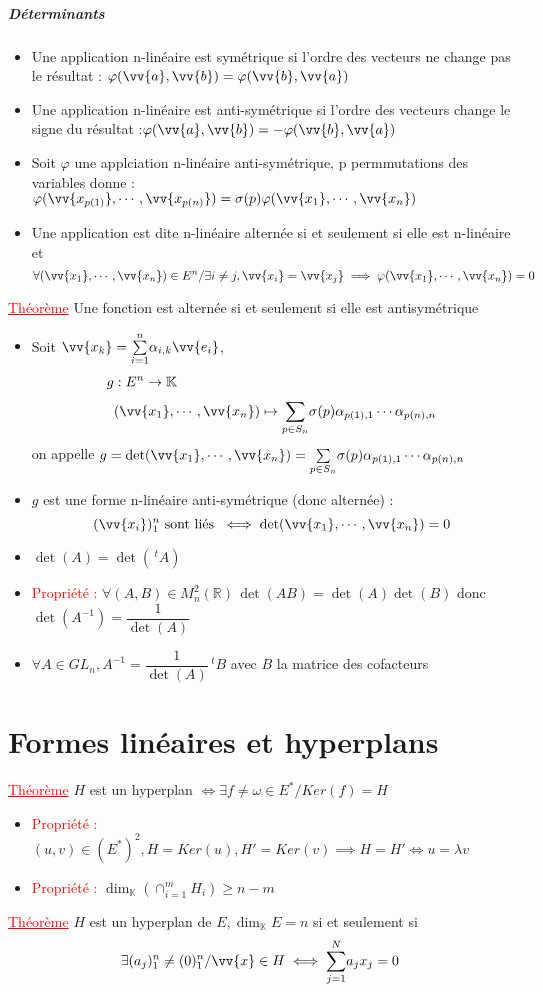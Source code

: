 \documentclass[a4paper, 11pts, french]{article}
\newcommand{\R}{\mathbb{R}}
\newcommand{\K}{\mathbb{K}}
\newcommand{\al}{\alpha}
\newcommand{\la}{\lambda}
\newcommand{\ph}{\varphi}
\newcommand{\som}[2]{\overset{#2}{\underset{#1}{\sum}}}
\newcommand{\thm}{\textcolor{red}{\underline{Théorème} }}
\newcommand{\ppt}{\textcolor{red}{Propriété : }}
\begin{document}
	\subparagraph{Déterminants}
	\begin{itemize}
 		\item Une application n-linéaire est symétrique si l'ordre des vecteurs ne change pas le résultat : $\ph(\vv{a},\vv{b})=\ph(\vv{b},\vv{a})$
 		\item Une application n-linéaire est anti-symétrique si l'ordre des vecteurs change le signe du résultat :$\ph(\vv{a},\vv{b})= - \ph(\vv{b},\vv{a})$
 		\item Soit $\ph$ une applciation n-linéaire anti-symétrique, p permmutations des variables donne : $\ph(\vv{x_{p(1)}},\cdots,\vv{x_{p(n)}})= \sigma(p) \ph(\vv{x_1},\cdots,\vv{x_n})$
		\item Une application est dite n-linéaire alternée si et seulement si elle est n-linéaire et
		 \[\forall (\vv{x_1},\cdots,\vv{x_n}) \in E^n / \exists i  \neq j, \vv{x_i}=\vv{x_j} \implies \ph(\vv{x_1},\cdots,\vv{x_n})=0\]
	\end{itemize}
	 \thm Une fonction est alternée si et seulement si elle est antisymétrique
	\begin{itemize}
 		\item Soit $\vv{x_k}=\som{i=1}{n}\al_{i,k}\vv{e_i}$, 
			\begin{align*}
				g &: E^n \rightarrow \K \\
				&(\vv{x_1},\cdots,\vv{x_n}) \mapsto \som{p\in S_n}{}\sigma(p)\al_{p(1),1}\cdots\al_{p(n),n}
			\end{align*}
			on appelle $g=\det(\vv{x_1},\cdots,\vv{x_n})=\som{p\in S_n}{}\sigma(p)\al_{p(1),1}\cdots\al_{p(n),n}$
 		\item $g$ est une forme n-linéaire anti-symétrique (donc alternée) : $$(\vv{x_i})_1^n \text{ sont liés }\iff \det(\vv{x_1},\cdots,\vv{x_n})=0$$
 		\item $\det(A)=\det(\,^tA)$
 		\item \ppt $\forall (A,B)\in M_n^2(\R) \, \det(AB)=\det(A)\det(B)$ donc $\det(A^{-1})=\dfrac{1}{\det(A)}$
 		\item $\forall A \in GL_n, A^{-1}=\dfrac{1}{\det(A)}\,^tB$ avec $B$ la matrice des cofacteurs
	\end{itemize}

	\section{Formes linéaires et hyperplans}
	 \thm $H$ est un hyperplan $\iff \exists f \neq \omega \in E^* / Ker(f)=H$
	\begin{itemize}
 		\item \ppt $(u,v)\in (E^*)^2, H=Ker(u), H'=Ker(v) \implies H=H' \iff u=\la v$
 		\item \ppt $\dim_{\K}(\cap_{i=1}^m H_i)\geqslant n-m$
	\end{itemize}
	 \thm $H$ est un hyperplan de $E, \dim_{\K}E=n$ si et seulement si $$\exists (a_j)_1^n \neq (0)_1^n / \vv{x} \in H \iff \som{j=1}{N}a_jx_j=0$$
\end{document}
